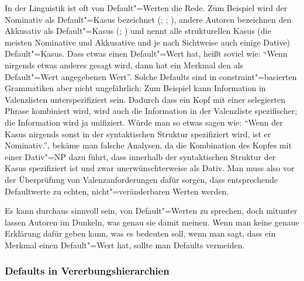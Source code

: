In der Linguistik ist oft von Default"=Werten die Rede. 
Zum Beispiel wird der Nominativ als Default"=Kasus bezeichnet (\citealp[]{Sternefeld95a}; \citealp[]{Jacobs91a}; 
\citealp[, ]{Abraham2005a}), %
andere Autoren bezeichnen den Akkusativ als Default"=Kasus (\citealp[]{Zwicky86};
\citealp[]{Hoeksema91c}) und \citet[]{Wunderlich93a} nennt alle strukturellen Kasus
(\dash die meisten Nominative und Akkusative und je nach Sichtweise auch einige Dative) Default"=Kasus.
%
Dass etwas einen Default"=Wert hat, heißt soviel wie: "`Wenn nirgends etwas anderes gesagt
wird, dann hat ein Merkmal den als Default"=Wert angegebenen Wert"'. Solche Defaults sind
in constraint"=basierten Grammatiken aber nicht ungefährlich: Zum Beispiel kann Information
in Valenzlisten unterspezifiziert sein. Dadurch dass ein Kopf mit einer selegierten Phrase
kombiniert wird, wird auch die Information in der Valenzliste spezifischer; die
Information wird ja unifiziert. Würde man so etwas sagen wie: "`Wenn der Kasus nirgends
sonst in der syntaktischen Struktur spezifiziert wird, ist er Nominativ."', bekäme man falsche
Analysen, da die Kombination des Kopfes mit einer Dativ"=NP dazu führt, dass innerhalb der
syntaktischen Struktur der Kasus spezifiziert ist und zwar unerwünschterweise als Dativ.
Man muss also vor der Überprüfung von Valenzanforderungen dafür sorgen, dass entsprechende
Defaultwerte zu echten, nicht"=veränderbaren Werten werden.

Es kann durchaus sinnvoll sein, von Default"=Werten zu sprechen, doch mitunter lassen Autoren im Dunkeln,
was genau sie damit meinen. Wenn man keine genaue Erklärung dafür geben kann, 
was es bedeuten soll, wenn man sagt, dass ein Merkmal einen Default"=Wert hat,
sollte man Defaults vermeiden.

\subsubsection{Defaults in Vererbungshierarchien}

